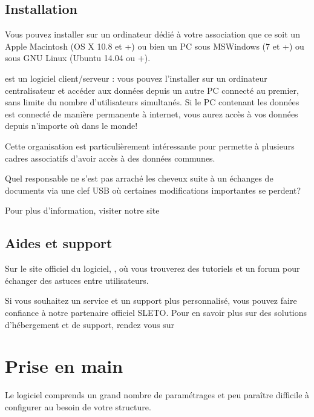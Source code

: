 \documentclass[a4paper,10pt,oneside,french]{sphinxmanual}
\begin{document}
\subsection{Installation}
\label{\detokenize{pro/presentation:installation}}
Vous pouvez installer  sur un ordinateur dédié à votre association que ce soit un Apple Macintosh (OS X 10.8 et +) ou bien un PC sous MS\sphinxhyphen{}Windows (7 et +) ou sous GNU Linux (Ubuntu 14.04 ou +).

 est un logiciel client/serveur : vous pouvez l’installer sur un ordinateur centralisateur et accéder aux données depuis un autre PC connecté au premier, sans limite du nombre d’utilisateurs simultanés.
Si le PC contenant les données est connecté de manière permanente à internet, vous aurez accès à vos données depuis n’importe où dans le monde!

Cette organisation est particulièrement intéressante pour permette à plusieurs cadres associatifs d’avoir accès à des données communes.

Quel responsable ne s’est pas arraché les cheveux suite à un échanges de documents via une clef USB où certaines modifications importantes se perdent?

Pour plus d’information, visiter notre site 


\subsection{Aides et support}
\label{\detokenize{pro/presentation:aides-et-support}}
Sur le site officiel du logiciel, , où vous trouverez des tutoriels et un forum pour échanger des astuces entre utilisateurs.

Si vous souhaitez un service et un support plus personnalisé, vous pouvez faire confiance à notre partenaire officiel SLETO.
Pour en savoir plus sur des solutions d’hébergement et de support, rendez vous sur 


\section{Prise en main}
\label{\detokenize{pro/first_step:prise-en-main}}\label{\detokenize{pro/first_step::doc}}
Le logiciel  comprends un grand nombre de paramétrages et peu paraître difficile à configurer au besoin de votre structure.
\end{document}
